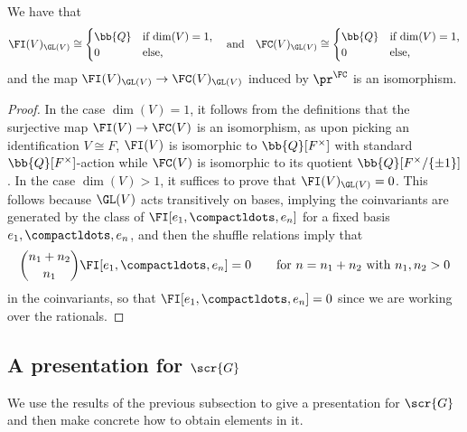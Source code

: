 \documentclass[a4paper]{amsart}
\begin{document}
\begin{lemma}\label{lem:fi-fc-coinvariants} We have that
\[\FI(V)_{\GL(V)} \cong \begin{cases} \bb{Q} & \text{if $\dim(V) = 1$,} \\
0 & \text{else,}\end{cases} \quad \text{and} \quad \FC(V)_{\GL(V)} \cong \begin{cases} \bb{Q} & \text{if $\dim(V) = 1$,} \\
0 & \text{else,}\end{cases}\]
and the map $\FI(V)_{\GL(V)} \to \FC(V)_{\GL(V)}$ induced by $\pr^\FC$ is an isomorphism.
\end{lemma}

\begin{proof}In the case $\dim(V)=1$, it follows from the definitions that the surjective map $\FI(V) \to \FC(V)$ is an isomorphism, as upon picking an identification $V \cong F$, $\FI(V)$ is isomorphic to $\bb{Q}[F^\times]$ with standard $\bb{Q}[F^\times]$-action while $\FC(V)$ is isomorphic to its quotient $\bb{Q}[F^\times/\{\pm 1\}]$. In the case $\dim(V)>1$, it suffices to prove that $\FI(V)_{\GL(V)} = 0$. This follows because $\GL(V)$ acts transitively on bases, implying the coinvariants are generated by the class of $\FI[e_1,\compactldots,e_n]$ for a fixed basis $e_1,\compactldots,e_n$, and then the shuffle relations imply that 
\[{n_1+n_2 \choose n_1} \FI[e_1,\compactldots,e_n] = 0 \qquad \text{for $n=n_1+n_2$ with $n_1,n_2>0$}\]
in the coinvariants, so that $\FI[e_1,\compactldots,e_n] = 0$ since we are working over the rationals.
\end{proof}

\subsection{A presentation for $\scr{G}$}\label{sec:generators of G}  We use the results of the previous subsection to give a presentation for $\scr{G}$ and then make concrete how to obtain elements in it.
\end{document}
